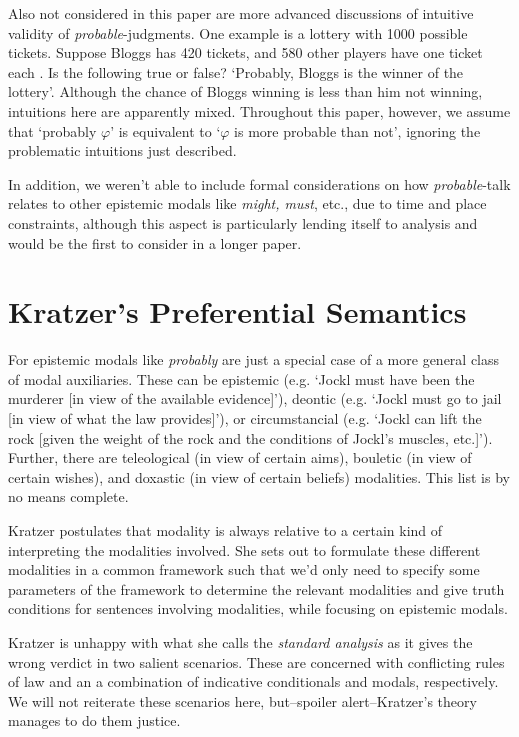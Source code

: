 \documentclass{article}
\theoremstyle{definition}
\begin{document}
Also not considered in this paper are more advanced discussions of intuitive validity of \emph{probable}-judgments. One example is a lottery with 1000 possible tickets.
Suppose Bloggs has 420 tickets, and 580 other players have one ticket each \parencite[p.~931]{yalcin10_probab_operat}. Is the following true or false?
`Probably, Bloggs is the winner of the lottery'. Although the chance of Bloggs winning is less than him not winning, intuitions here are apparently mixed. Throughout this paper, however, we assume that `probably $\varphi$' is equivalent to `$\varphi$ is more probable than not', ignoring the problematic intuitions just described.

In addition, we weren't able to include formal considerations on how \emph{probable}-talk relates to other epistemic modals like \emph{might, must}, etc., due to time and place constraints, although this aspect is particularly lending itself to analysis and would be the first to consider in a longer paper.

\section{Kratzer's Preferential Semantics}
For \textcite{kratzer91_modal} epistemic modals like \emph{probably} are just a special case of a more general class of modal auxiliaries.
These can be epistemic (e.g. `Jockl must have been the murderer [in view of the available evidence]'), deontic (e.g. `Jockl must go to jail [in view of what the law provides]'), or circumstancial (e.g. `Jockl can lift the rock [given the weight of the rock and the conditions of Jockl's muscles, etc.]').
Further, there are teleological (in view of certain aims), bouletic (in view of certain wishes), and doxastic (in view of certain beliefs) modalities.
This list is by no means complete.

Kratzer postulates that modality is always relative to a certain kind of interpreting the modalities involved.
She sets out to formulate these different modalities in a common framework such that we'd only need to specify some parameters of the framework to determine the relevant modalities and give truth conditions for sentences involving modalities, while focusing on epistemic modals.

Kratzer is unhappy with what she calls the \emph{standard analysis} as it gives the wrong verdict in two salient scenarios.
These are concerned with conflicting rules of law and an a combination of indicative conditionals and modals, respectively.
We will not reiterate these scenarios here, but--spoiler alert--Kratzer's theory manages to do them justice.
\end{document}
